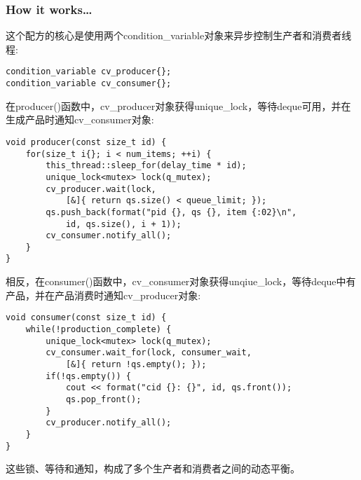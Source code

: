 \subsubsection{How it works…}

这个配方的核心是使用两个condition\_variable对象来异步控制生产者和消费者线程:

\begin{lstlisting}[style=styleCXX]
condition_variable cv_producer{};
condition_variable cv_consumer{};
\end{lstlisting}

在producer()函数中，cv\_producer对象获得unique\_lock，等待deque可用，并在生成产品时通知cv\_consumer对象:

\begin{lstlisting}[style=styleCXX]
void producer(const size_t id) {
	for(size_t i{}; i < num_items; ++i) {
		this_thread::sleep_for(delay_time * id);
		unique_lock<mutex> lock(q_mutex);
		cv_producer.wait(lock,
			[&]{ return qs.size() < queue_limit; });
		qs.push_back(format("pid {}, qs {}, item {:02}\n",
			id, qs.size(), i + 1));
		cv_consumer.notify_all();
	}
}
\end{lstlisting}

相反，在consumer()函数中，cv\_consumer对象获得unqiue\_lock，等待deque中有产品，并在产品消费时通知cv\_producer对象:

\begin{lstlisting}[style=styleCXX]
void consumer(const size_t id) {
	while(!production_complete) {
		unique_lock<mutex> lock(q_mutex);
		cv_consumer.wait_for(lock, consumer_wait,
			[&]{ return !qs.empty(); });
		if(!qs.empty()) {
			cout << format("cid {}: {}", id, qs.front());
			qs.pop_front();
		}
		cv_producer.notify_all();
	}
}
\end{lstlisting}

这些锁、等待和通知，构成了多个生产者和消费者之间的动态平衡。








